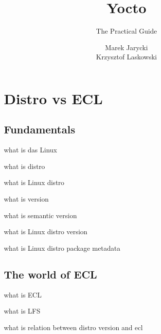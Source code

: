 \documentclass{beamer}
\title[Yocto: The Practical Guide]{Yocto}
\subtitle{The Practical Guide}
\author[M. Jarycki, K. Laskowski]{
    Marek Jarycki \\
    Krzysztof Laskowski
}
\begin{document}
\begin{frame}
    \titlepage
\end{frame}

\begin{frame}
    \tableofcontents
\end{frame}

\section{Distro vs ECL}

\subsection{Fundamentals}

\begin{frame}{what is das Linux}
\end{frame}

\begin{frame}{what is distro}
\end{frame}

\begin{frame}{what is Linux distro}
\end{frame}

\begin{frame}{what is version}
\end{frame}

\begin{frame}{what is semantic version}
\end{frame}

\begin{frame}{what is Linux distro version}
\end{frame}

\begin{frame}{what is Linux distro package metadata}
\end{frame}

\subsection{The world of ECL}

\begin{frame}{what is ECL}
\end{frame}

\begin{frame}{what is LFS}
\end{frame}

\begin{frame}{what is relation between distro version and ecl}
\end{frame}
\end{document}
